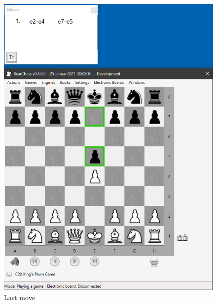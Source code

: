 \documentclass[11pt,a4paper]{article}
\begin{document}
\begin{figure}[H]
	\centering
	\includegraphics[scale=0.8]{LastMove.png}
	\caption{Last move }
	\label{fig:LastMove}
\end{figure}
\end{document}

